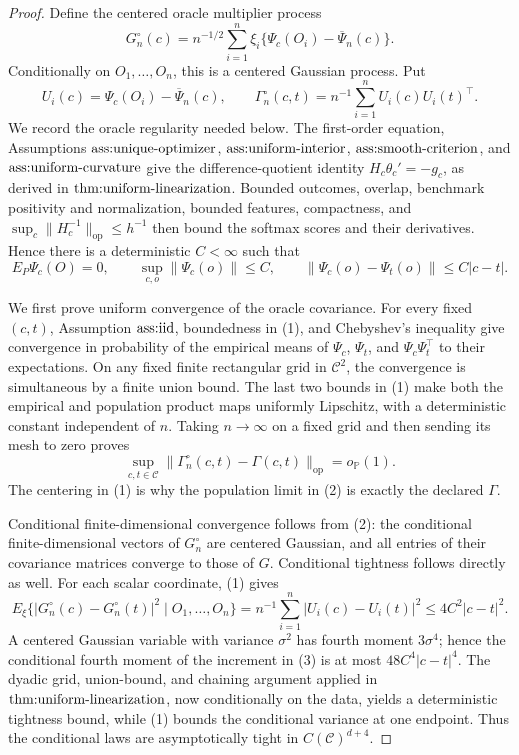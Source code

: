 \documentclass{article}
\begin{document}
\begin{proof}
Define the centered oracle multiplier process
\[
 G_n^\circ(c)=n^{-1/2}\sum_{i=1}^n\xi_i
 \{\Psi_c(O_i)-\overline\Psi_n(c)\}.
\]
Conditionally on \(O_1,\ldots,O_n\), this is a centered Gaussian process.  Put
\[
 U_i(c)=\Psi_c(O_i)-\overline\Psi_n(c),
 \qquad
 \Gamma_n^\circ(c,t)=n^{-1}\sum_{i=1}^nU_i(c)U_i(t)^\top.
\]
We record the oracle regularity needed below.  The first-order equation, Assumptions \(\textnormal{ass:unique-optimizer}\), \(\textnormal{ass:uniform-interior}\), \(\textnormal{ass:smooth-criterion}\), and \(\textnormal{ass:uniform-curvature}\) give the difference-quotient identity \(H_c\theta_c'=-g_c\), as derived in \(\textnormal{thm:uniform-linearization}\).  Bounded outcomes, overlap, benchmark positivity and normalization, bounded features, compactness, and \(\sup_c\|H_c^{-1}\|_{\mathrm{op}}\le h^{-1}\) then bound the softmax scores and their derivatives.  Hence there is a deterministic \(C<\infty\) such that
\[
 E_P\Psi_c(O)=0,
 \qquad
 \sup_{c,o}\|\Psi_c(o)\|\le C,
 \qquad
 \|\Psi_c(o)-\Psi_t(o)\|\le C|c-t|. \tag{1}
\]

We first prove uniform convergence of the oracle covariance.  For every fixed \((c,t)\), Assumption \(\textnormal{ass:iid}\), boundedness in (1), and Chebyshev's inequality give convergence in probability of the empirical means of \(\Psi_c\), \(\Psi_t\), and \(\Psi_c\Psi_t^\top\) to their expectations.  On any fixed finite rectangular grid in \(\mathcal C^2\), the convergence is simultaneous by a finite union bound.  The last two bounds in (1) make both the empirical and population product maps uniformly Lipschitz, with a deterministic constant independent of \(n\).  Taking \(n\to\infty\) on a fixed grid and then sending its mesh to zero proves
\[
 \sup_{c,t\in\mathcal C}
 \|\Gamma_n^\circ(c,t)-\Gamma(c,t)\|_{\mathrm{op}}
 =o_{\mathbb P}(1). \tag{2}
\]
The centering in (1) is why the population limit in (2) is exactly the declared \(\Gamma\).

Conditional finite-dimensional convergence follows from (2): the conditional finite-dimensional vectors of \(G_n^\circ\) are centered Gaussian, and all entries of their covariance matrices converge to those of \(G\).  Conditional tightness follows directly as well.  For each scalar coordinate, (1) gives
\[
 E_\xi\{|G_n^\circ(c)-G_n^\circ(t)|^2\mid O_1,\ldots,O_n\}
 =n^{-1}\sum_{i=1}^n|U_i(c)-U_i(t)|^2
 \le4C^2|c-t|^2. \tag{3}
\]
A centered Gaussian variable with variance \(\sigma^2\) has fourth moment \(3\sigma^4\); hence the conditional fourth moment of the increment in (3) is at most \(48C^4|c-t|^4\).  The dyadic grid, union-bound, and chaining argument applied in \(\textnormal{thm:uniform-linearization}\), now conditionally on the data, yields a deterministic tightness bound, while (1) bounds the conditional variance at one endpoint.  Thus the conditional laws are asymptotically tight in \(C(\mathcal C)^{d+4}\).


\end{proof}
\end{document}
